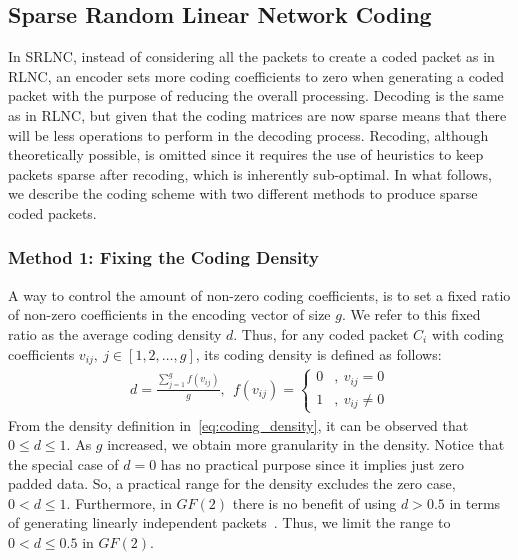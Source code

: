 \subsection{Sparse Random Linear Network Coding}

In \ac{SRLNC}, instead of considering all the packets to create a
coded packet as in \ac{RLNC}, an encoder sets more coding coefficients
to zero when generating a coded packet with the purpose of reducing
the overall processing.  Decoding is the same as in \ac{RLNC}, but
given that the coding matrices are now sparse means that there will be less
operations to perform in the decoding process.  Recoding, although
theoretically possible, is omitted since it requires the use of
heuristics to keep packets sparse after recoding, which is inherently
sub-optimal.
In what follows, we describe the coding scheme with two
different methods to produce sparse coded packets.

\subsubsection{Method 1: Fixing the Coding Density}
A way to control the amount of non-zero coding coefficients, is to set a
fixed ratio of non-zero coefficients in the encoding vector of size $g$. We
refer to this fixed ratio as the average coding density $d$. Thus, for any
coded packet $C_i$ with coding coefficients $v_{ij},\ j \in [1,2,\ldots,g]$, its
coding density is defined as follows:
%
\begin{align}
\label{eq:coding_density}
d = \frac{\sum_{j=1}^{g} f(v_{ij})}{g},\ \
    f(v_{ij}) =
    \begin{cases}
        0 &,\ v_{ij} = 0 \\
        1 &,\ v_{ij} \neq 0
    \end{cases}
\end{align}
%
From the density definition in~\eqref{eq:coding_density}, it can be
observed that $0 \leq d \leq 1$. As $g$ increased, we obtain more
granularity in the density. Notice that the special case of  $d = 0$ has no
practical purpose since it implies just zero padded data.
So, a practical
range for the density excludes the zero case, $0 < d \leq 1$.
%
Furthermore, in $GF(2)$ there is no benefit of using $d > 0.5$ in terms of
generating linearly independent packets~\cite{realworld_nc2013}. Thus,
we limit the range to $0 < d \leq 0.5$ in $GF(2)$.

